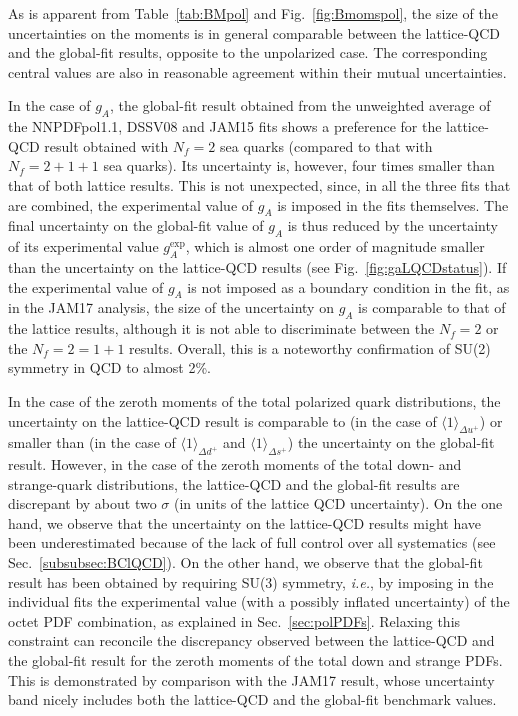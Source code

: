 As is apparent from Table~\ref{tab:BMpol} and Fig.~\ref{fig:Bmomspol}, the 
size of the uncertainties on the moments is in general comparable between the 
lattice-QCD and the global-fit results, opposite to the unpolarized case.
%
The corresponding central values are also in reasonable agreement within their
mutual uncertainties.

In the case of $g_A$, the global-fit result obtained from the unweighted 
average of the NNPDFpol1.1, DSSV08 and JAM15 fits shows a preference for the
lattice-QCD result obtained with $N_f=2$ sea quarks (compared to that with 
$N_f=2+1+1$ sea quarks).
%
Its uncertainty is, however, four times smaller than that of both lattice 
results.
%
This is not unexpected, since, in all the three fits that are combined, the 
experimental value of $g_A$ is imposed in the fits themselves.
%
The final uncertainty on the global-fit value of $g_A$ is thus reduced by 
the uncertainty of its experimental value $g_A^\text{exp}$, which is almost
one order of magnitude smaller than the uncertainty on the lattice-QCD results
(see Fig.~\ref{fig:gaLQCDstatus}).
%
If the experimental value of $g_A$ is not imposed as a boundary condition in 
the fit, as in the JAM17 analysis, the size of the uncertainty on $g_A$ is 
comparable to that of the lattice results, although it is not able to 
discriminate between the $N_f=2$ or the $N_f=2=1+1$ results.
%
Overall, this is a noteworthy confirmation of SU(2) symmetry in QCD to
almost 2\%.

In the case of the zeroth moments of the total polarized quark distributions,
the uncertainty on the lattice-QCD result is comparable to (in the case
of $\langle 1 \rangle_{\Delta u^+}$) or smaller than (in the case
of $\langle 1 \rangle_{\Delta d^+}$ and $\langle 1 \rangle_{\Delta s^+}$)
the uncertainty on the global-fit result.
%
However, in the case of the zeroth moments of the total down- and strange-quark 
distributions, the lattice-QCD and the global-fit results are discrepant
by about two $\sigma$ (in units of the
lattice QCD uncertainty).
%
On the one hand, we observe that the uncertainty on the lattice-QCD results 
might have been underestimated because of the lack of full control over
all systematics (see Sec.~\ref{subsubsec:BClQCD}).
%
On the other hand, we observe that the global-fit result has been obtained
by requiring SU(3) symmetry, {\it i.e.}, by imposing in the individual fits 
the experimental value (with a possibly inflated uncertainty) of the octet PDF 
combination, as explained in Sec.~\ref{sec:polPDFs}.
%
Relaxing this constraint can reconcile the discrepancy observed between 
the lattice-QCD and the global-fit result for the zeroth moments of the 
total down and strange PDFs.
%
This is demonstrated by comparison with the JAM17 result, whose uncertainty 
band nicely includes both the lattice-QCD and the global-fit benchmark values.

